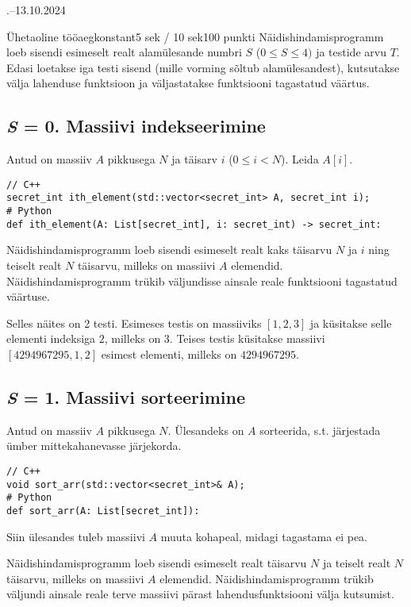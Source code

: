 \documentclass[a4paper,11pt]{article}
\begin{document}
\begin{ol}{\eio}{.--13.10.2024}{\yle}{}
\begin{yl}{7}{Ühetaoline tööaeg}{konstant}{5 sek / 10 sek}{100 punkti}
	Näidishindamisprogramm loeb sisendi esimeselt realt alamülesande numbri $S$ ($0 \le S \le 4)$ ja testide arvu $T$. Edasi loetakse iga testi sisend (mille vorming sõltub alamülesandest), kutsutakse välja lahenduse funktsioon ja väljastatakse funktsiooni tagastatud väärtus.

	\subsection*{\emph{S} = 0. Massiivi indekseerimine}

	Antud on massiiv $A$ pikkusega $N$ ja täisarv $i$ ($0 \le i < N$). Leida $A[i]$.

\begin{verbatim}
// C++
secret_int ith_element(std::vector<secret_int> A, secret_int i);
# Python
def ith_element(A: List[secret_int], i: secret_int) -> secret_int:
\end{verbatim}

	Näidishindamisprogramm loeb sisendi esimeselt realt kaks täisarvu $N$ ja $i$ ning teiselt realt $N$ täisarvu, milleks on massiivi $A$ elemendid. Näidishindamisprogramm trükib väljundisse ainsale reale funktsiooni tagastatud väärtuse.

	\nde[0]{4cm}{4cm}
	Selles näites on 2 testi. Esimeses testis on massiiviks $[1, 2, 3]$ ja küsitakse selle elementi indeksiga $2$, milleks on $3$. Teises testis küsitakse massiivi $[4294967295, 1, 2]$ esimest elementi, milleks on $4294967295$.

	\subsection*{\emph{S} = 1. Massiivi sorteerimine}

	Antud on massiiv $A$ pikkusega $N$. Ülesandeks on $A$ sorteerida, s.t. järjestada ümber mittekahanevasse järjekorda.

\begin{verbatim}
// C++
void sort_arr(std::vector<secret_int>& A);
# Python
def sort_arr(A: List[secret_int]):
\end{verbatim}

	Siin ülesandes tuleb massiivi $A$ muuta kohapeal, midagi tagastama ei pea.

	Näidishindamisprogramm loeb sisendi esimeselt realt täisarvu $N$ ja teiselt realt $N$ täisarvu, milleks on massiivi $A$ elemendid. Näidishindamisprogramm trükib väljundi ainsale reale terve massiivi pärast lahendusfunktsiooni välja kutsumist.


\end{yl}
\end{ol}
\end{document}

